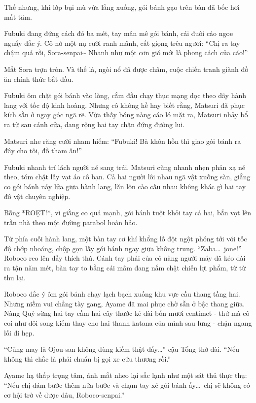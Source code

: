\documentclass[../main.tex]{subfiles}
\begin{document}

Thế nhưng, khi lớp bụi mù vừa lắng xuống, gói bánh gạo trên bàn đã bốc hơi mất tăm.

Fubuki đang đứng cách đó ba mét, tay mân mê gói bánh, cái đuôi cáo ngoe nguẩy đắc ý. Cô nở một nụ cười ranh mãnh, cất giọng trêu ngươi: ``Chị ra tay chậm quá rồi, Sora-senpai\~{} Nhanh như một cơn gió mới là phong cách của cáo!''

Mắt Sora trợn tròn. Và thế là, ngòi nổ đã được châm, cuộc chiến tranh giành đồ ăn chính thức bắt đầu.

\ct

Fubuki ôm chặt gói bánh vào lòng, cắm đầu chạy thục mạng dọc theo dãy hành lang với tốc độ kinh hoàng. Nhưng cô không hề hay biết rằng,  Matsuri đã phục kích sẵn ở ngay góc ngã rẽ. Vừa thấy bóng nàng cáo ló mặt ra, Matsuri nhảy bổ ra từ sau cánh cửa, dang rộng hai tay chặn đứng đường lui.

Matsuri nhe răng cười nham hiểm:
``Fubuki! Bà khôn hồn thì giao gói bánh ra đây cho tôi, đồ tham ăn!''

Fubuki nhanh trí lách người né sang trái. Matsuri cũng nhanh nhẹn phản xạ né theo, tóm chặt lấy vạt áo cô bạn. Cả hai người lôi nhau ngã vật xuống sàn, giằng co gói bánh nảy lửa giữa hành lang, lăn lộn cào cấu nhau không khác gì hai tay đô vật chuyên nghiệp.

Bỗng *ROẸT!*, vì giằng co quá mạnh, gói bánh tuột khỏi tay cả hai, bắn vọt lên trần nhà theo một đường parabol hoàn hảo.

Từ phía cuối hành lang, một bàn tay cơ khí khổng lồ đột ngột phóng tới với tốc độ chớp nhoáng, chộp gọn lấy gói bánh ngay giữa không trung.
``Zaba\dots\ jone!'' Roboco reo lên đầy thích thú. Cánh tay phải của cô nàng người máy đã kéo dài ra tận năm mét, bàn tay to bằng cái mâm đang nắm chặt chiến lợi phẩm, từ từ thu lại.

Roboco đắc ý ôm gói bánh chạy lạch bạch xuống khu vực cầu thang tầng hai. Nhưng niềm vui chẳng tày gang, Ayame đã mai phục chờ sẵn ở bậc thang giữa. Nàng Quỷ sừng hai tay cầm hai cây thước kẻ dài bốn mươi centimet - thứ mà cô coi như đôi song kiếm thay cho hai thanh katana của mình sau lưng - chặn ngang lối đi hẹp.

``Cũng may là Ojou-san không dùng kiếm thật đấy\dots'' cậu Tổng thở dài. ``Nếu không thì chắc là phải chuẩn bị gọi xe cứu thương rồi.''

Ayame hạ thấp trọng tâm, ánh mắt nheo lại sắc lạnh như một sát thủ thực thụ:
``Nếu chị dám bước thêm nửa bước và chạm tay xé gói bánh ấy\dots\ chị sẽ không có cơ hội trở về được đâu, Roboco-senpai.''
\end{document}
